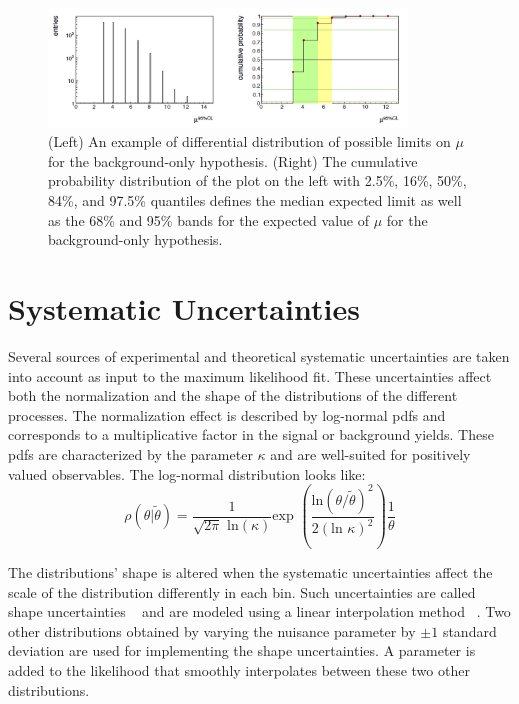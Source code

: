 \begin{figure}[!htpb]\centering
  \captionsetup{width=.87\textwidth,justification=centering}
  \includegraphics[width=0.85\textwidth]{plots/chapter8/Median.png}
  \caption{(Left) An example of differential distribution of possible limits on $\mu$ for the background-only hypothesis. (Right) The cumulative probability distribution of the plot on the left with 2.5\%, 16\%, 50\%, 84\%, and 97.5\% quantiles defines the median expected limit as well as the 68\% and 95\% bands for the expected value of $\mu$ for the background-only hypothesis.}
  \label{fig:median}
\end{figure}

\section{Systematic Uncertainties}

Several sources of experimental and theoretical systematic uncertainties are taken into account as input to the maximum likelihood fit. These uncertainties affect both the normalization and the shape of the distributions of the different processes. The normalization effect is described by log-normal pdfs and corresponds to a multiplicative factor in the signal or background yields. These pdfs are characterized by the parameter $\kappa$ and are well-suited for positively valued observables. The log-normal distribution looks like:
\begin{equation}
\rho(\theta|\tilde{\theta})=\frac{1}{\sqrt{2\pi}\text{ ln}(\kappa)}\text{exp }(\frac{\text{ln}(\theta/\tilde{\theta})^2}{2(\text{ln }\kappa)^2}) \frac{1}{\theta}
\end{equation}

The distributions' shape is altered when the systematic uncertainties affect the scale of the distribution differently in each bin. Such uncertainties are called shape uncertainties ~\cite{Conway:2011in} and are modeled using a linear interpolation method ~\cite{Read:1999kh}. Two other distributions obtained by varying the nuisance parameter by $\pm 1$ standard deviation are used for implementing the shape uncertainties. A parameter is added to the likelihood that smoothly interpolates between these two other distributions.

